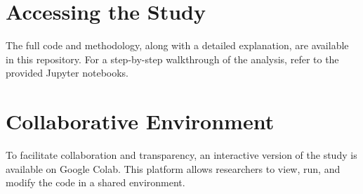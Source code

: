 \documentclass{article}
\begin{document}
\section*{Accessing the Study}
The full code and methodology, along with a detailed explanation, are available in this repository. For a step-by-step walkthrough of the analysis, refer to the provided Jupyter notebooks.

\section*{Collaborative Environment}
To facilitate collaboration and transparency, an interactive version of the study is available on Google Colab. This platform allows researchers to view, run, and modify the code in a shared environment.
\end{document}
